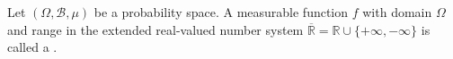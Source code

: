 Let $(\Omega, \mathcal{B}, \mu)$ be a probability space. A measurable function $f$ with domain $\Omega$ and range in the extended real-valued number system $\overline{\mathbb{R}} = \mathbb{R} \cup \{+\infty, -\infty\}$ is called a .
